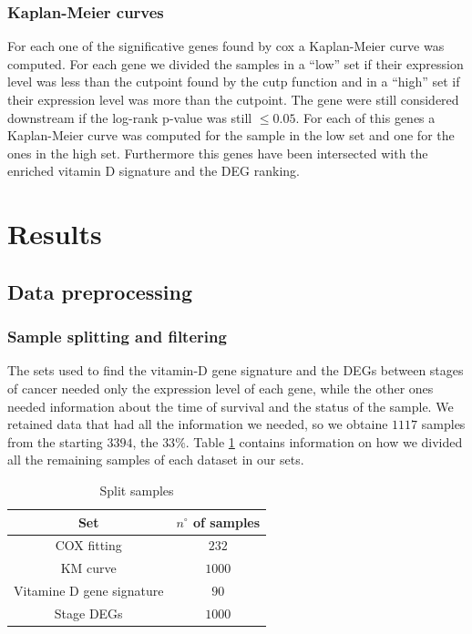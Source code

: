 \documentclass[fleqn,10pt]{SelfArx} %
\begin{document}
		\subsubsection{Kaplan-Meier curves}
			For each one of the significative genes found by cox a Kaplan-Meier curve was computed.
			For each gene we divided the samples in a ``low'' set if their expression level was less than the cutpoint found by the cutp function and in a ``high'' set if their expression level was more than the cutpoint.
			The gene were still considered downstream if the log-rank p-value was still $\le0.05$.
			For each of this genes a Kaplan-Meier curve was computed for the sample in the low set and one for the ones in the high set.
			Furthermore this genes have been intersected with the enriched vitamin D signature and the DEG ranking.


\section{Results}

	\subsection{Data preprocessing}

		\subsubsection{Sample splitting and filtering}
		The sets used to find the vitamin-D gene signature and the DEGs between stages of cancer needed only the expression level of each gene, while the other ones needed information about the time of survival and the status of the sample.
		We retained data that had all the information we needed, so we obtaine $1117$ samples from the starting $3394$, the $33\%$.
		Table \ref{tab:samples_split} contains information on how we divided all the remaining samples of each dataset in our sets.

		\begin{table}[H]
			\centering
			\begin{tabular}{cc}
				\hline
				Set & $n^\circ$ of samples\\
				\hline
				COX fitting & $232$\\
				KM curve & $1000$\\
				Vitamine D gene signature & $90$\\
				Stage DEGs & $1000$\\
				\hline
			\end{tabular}
			\caption{Split samples}
			\label{tab:samples_split}
		\end{table}
\end{document}
